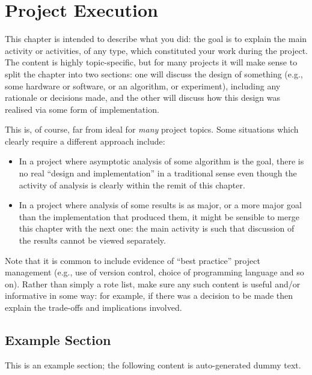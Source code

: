 \documentclass[ oneside,%
                    author={Joshua Felmeden},
                    degree={MEng},
                     title={Semantic Analysis of Financial Headlines Based on Realised Stock Returns},
                  subtitle={}]{dissertation}
\begin{document}

\chapter{Project Execution}
\label{chap:execution}

\noindent
This chapter is intended to describe what you did: the goal is to explain
the main activity or activities, of any type, which constituted your work 
during the project.  The content is highly topic-specific, but for many 
projects it will make sense to split the chapter into two sections: one 
will discuss the design of something (e.g., some hardware or software, or 
an algorithm, or experiment), including any rationale or decisions made, 
and the other will discuss how this design was realised via some form of 
implementation.  

This is, of course, far from ideal for {\em many} project topics.  Some
situations which clearly require a different approach include:

\begin{itemize}
\item In a project where asymptotic analysis of some algorithm is the goal,
      there is no real ``design and implementation'' in a traditional sense
      even though the activity of analysis is clearly within the remit of
      this chapter.
\item In a project where analysis of some results is as major, or a more
      major goal than the implementation that produced them, it might be
      sensible to merge this chapter with the next one: the main activity 
      is such that discussion of the results cannot be viewed separately.
\end{itemize}

\noindent
Note that it is common to include evidence of ``best practice'' project 
management (e.g., use of version control, choice of programming language 
and so on).  Rather than simply a rote list, make sure any such content 
is useful and/or informative in some way: for example, if there was a 
decision to be made then explain the trade-offs and implications 
involved.

\section{Example Section}

This is an example section; 
the following content is auto-generated dummy text.
\lipsum
\end{document}
